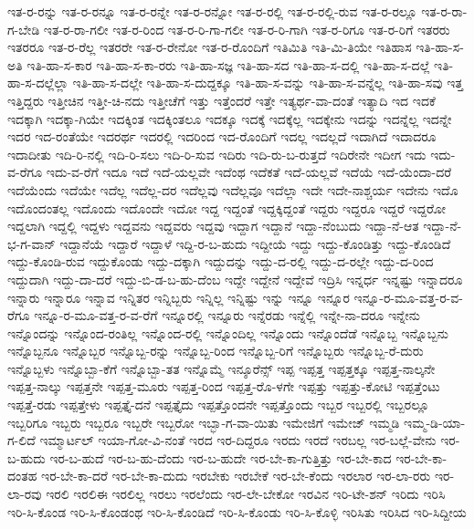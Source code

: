 {ಇತ-ರ-ರನ್ನು
ಇತ-ರ-ರನ್ನೂ
ಇತ-ರ-ರನ್ನೇ
ಇತ-ರ-ರನ್ನೋ
ಇತ-ರ-ರಲ್ಲಿ
ಇತ-ರ-ರಲ್ಲಿ-ರುವ
ಇತ-ರ-ರಲ್ಲೂ
ಇತ-ರ-ರಾ-ಗ-ಬೇಡಿ
ಇತ-ರ-ರಾ-ಗಲೀ
ಇತ-ರ-ರಿಂದ
ಇತ-ರ-ರಿ-ಗಾ-ಗಲೀ
ಇತ-ರ-ರಿ-ಗಾಗಿ
ಇತ-ರ-ರಿಗೂ
ಇತ-ರ-ರಿಗೆ
ಇತರರು
ಇತರರೂ
ಇತ-ರ-ರೆಲ್ಲ
ಇತರರೇ
ಇತ-ರ-ರೇನೋ
ಇತ-ರ-ರೊಂದಿಗೆ
ಇತಿಮಿತಿ
ಇತಿ-ಮಿ-ತಿಯೇ
ಇತಿಹಾಸ
ಇತಿ-ಹಾ-ಸ-ಅತಿ
ಇತಿ-ಹಾ-ಸ-ಕಾರ
ಇತಿ-ಹಾ-ಸ-ಕಾ-ರರು
ಇತಿ-ಹಾ-ಸಜ್ಞ
ಇತಿ-ಹಾ-ಸದ
ಇತಿ-ಹಾ-ಸ-ದಲ್ಲಿ
ಇತಿ-ಹಾ-ಸ-ದಲ್ಲೆ
ಇತಿ-ಹಾ-ಸ-ದಲ್ಲೆಲ್ಲಾ
ಇತಿ-ಹಾ-ಸ-ದಲ್ಲೇ
ಇತಿ-ಹಾ-ಸ-ದುದ್ದಕ್ಕೂ
ಇತಿ-ಹಾ-ಸ-ವನ್ನು
ಇತಿ-ಹಾ-ಸ-ವನ್ನೆಲ್ಲ
ಇತಿ-ಹಾ-ಸವು
ಇತ್ತ
ಇತ್ತಿದ್ದರು
ಇತ್ತೀಚಿನ
ಇತ್ತೀ-ಚಿ-ನದು
ಇತ್ತೀಚೆಗೆ
ಇತ್ತು
ಇತ್ತೆಂದರೆ
ಇತ್ತೇ
ಇತ್ಯರ್ಥ-ವಾ-ದಂತೆ
ಇತ್ಯಾದಿ
ಇದ
ಇದಕೆ
ಇದಕ್ಕಾಗಿ
ಇದಕ್ಕಾ-ಗಿಯೇ
ಇದಕ್ಕಿಂತ
ಇದಕ್ಕಿಂತಲೂ
ಇದಕ್ಕೂ
ಇದಕ್ಕೆ
ಇದಕ್ಕೆಲ್ಲ
ಇದಕ್ಕೇನು
ಇದನ್ನು
ಇದನ್ನೆಲ್ಲ
ಇದನ್ನೇ
ಇದರ
ಇದ-ರಂತೆಯೇ
ಇದರರ್ಥ
ಇದರಲ್ಲಿ
ಇದರಿಂದ
ಇದ-ರೊಂದಿಗೆ
ಇದಲ್ಲ
ಇದಲ್ಲದೆ
ಇದಾಗಿದೆ
ಇದಾದರೂ
ಇದಾದೀತು
ಇದಿ-ರಿ-ನಲ್ಲಿ
ಇದಿ-ರಿ-ಸಲು
ಇದಿ-ರಿ-ಸುವ
ಇದಿರು
ಇದಿ-ರು-ಬ-ರುತ್ತದೆ
ಇದಿರೇನೇ
ಇದೀಗ
ಇದು
ಇದು-ವ-ರೆಗೂ
ಇದು-ವ-ರೆಗೆ
ಇದೂ
ಇದೆ
ಇದೆ-ಯಲ್ಲವೇ
ಇದೆಂಥ
ಇದೆಕತೆ
ಇದೆ-ಯಲ್ಲವೆ
ಇದೆಯೆ
ಇದೆ-ಯೆಂದಾ-ದರೆ
ಇದೆಯೆಂದು
ಇದೆಯೇ
ಇದೆಲ್ಲ
ಇದೆಲ್ಲ-ದರ
ಇದೆಲ್ಲವು
ಇದೆಲ್ಲವೂ
ಇದೆಲ್ಲಾ
ಇದೇ
ಇದೇ-ನಾಶ್ಚರ್ಯ
ಇದೇನು
ಇದೊ
ಇದೊಂದಂತಲ್ಲ
ಇದೊಂದು
ಇದೊಂದೇ
ಇದೋ
ಇದ್ದ
ಇದ್ದಂತೆ
ಇದ್ದಕ್ಕಿದ್ದಂತೆ
ಇದ್ದರು
ಇದ್ದರೂ
ಇದ್ದರೆ
ಇದ್ದರೋ
ಇದ್ದಲಾಗಿ
ಇದ್ದಲ್ಲಿ
ಇದ್ದಳು
ಇದ್ದವನು
ಇದ್ದವರು
ಇದ್ದವು
ಇದ್ದಾಗ
ಇದ್ದಾನೆ
ಇದ್ದಾ-ನೆಂಬುದು
ಇದ್ದಾ-ನೆ-ಆತ
ಇದ್ದಾ-ನೆ-ಭ-ಗ-ವಾನ್
ಇದ್ದಾನೆಯೆ
ಇದ್ದಾರೆ
ಇದ್ದಾಳೆ
ಇದ್ದಿ-ರ-ಬ-ಹುದು
ಇದ್ದೀಯೆ
ಇದ್ದು
ಇದ್ದು-ಕೊಂಡಿತ್ತು
ಇದ್ದು-ಕೊಂಡಿದೆ
ಇದ್ದು-ಕೊಂಡಿ-ರುವ
ಇದ್ದುಕೊಂಡು
ಇದ್ದು-ದಕ್ಕಾಗಿ
ಇದ್ದುದನ್ನು
ಇದ್ದು-ದ-ರಲ್ಲಿ
ಇದ್ದು-ದ-ರಲ್ಲೇ
ಇದ್ದು-ದ-ರಿಂದ
ಇದ್ದುದಾಗಿ
ಇದ್ದು-ದಾ-ದರೆ
ಇದ್ದು-ಬಿ-ಡ-ಬ-ಹು-ದೆಂಬ
ಇದ್ದೇ
ಇದ್ದೇನೆ
ಇದ್ದೇವೆ
ಇದ್ರಿಸಿ
ಇನ್ನರ್ಧ
ಇನ್ನಷ್ಟು
ಇನ್ನಾದರೂ
ಇನ್ನಾರು
ಇನ್ನಾರೂ
ಇನ್ನಾವ
ಇನ್ನಿತರ
ಇನ್ನಿಬ್ಬರು
ಇನ್ನಿಲ್ಲ
ಇನ್ನಿಷ್ಟು
ಇನ್ನು
ಇನ್ನೂ
ಇನ್ನೂರ
ಇನ್ನೂ-ರ-ಮೂ-ವತ್ತ-ರ-ವ-ರೆಗೂ
ಇನ್ನೂ-ರ-ಮೂ-ವತ್ತ-ರ-ವ-ರೆಗೆ
ಇನ್ನೂರಲ್ಲಿ
ಇನ್ನೂರು
ಇನ್ನೆರಡು
ಇನ್ನೆಲ್ಲಿ
ಇನ್ನೇ-ನಾ-ದರೂ
ಇನ್ನೇನು
ಇನ್ನೊಂದನ್ನು
ಇನ್ನೊಂದ-ರಂತಿಲ್ಲ
ಇನ್ನೊಂದ-ರಲ್ಲಿ
ಇನ್ನೊಂದಿಲ್ಲ
ಇನ್ನೊಂದು
ಇನ್ನೊಂದೆಡೆ
ಇನ್ನೊಬ್ಬ
ಇನ್ನೊಬ್ಬನು
ಇನ್ನೊಬ್ಬನೂ
ಇನ್ನೊಬ್ಬರ
ಇನ್ನೊಬ್ಬ-ರನ್ನು
ಇನ್ನೊಬ್ಬ-ರಿಂದ
ಇನ್ನೊಬ್ಬ-ರಿಗೆ
ಇನ್ನೊಬ್ಬರು
ಇನ್ನೊಬ್ಬ-ರೆ-ದುರು
ಇನ್ನೊಬ್ಬಳು
ಇನ್ನೊಬ್ಬಾ-ಕೆಗೆ
ಇನ್ನೊಬ್ಬಾ-ತತ
ಇನ್ನೊಮ್ಮೆ
ಇನ್ಶೂರೆನ್ಸ್
ಇಪ್ಪ
ಇಪ್ಪತ್ತ
ಇಪ್ಪತ್ತಕ್ಕೂ
ಇಪ್ಪತ್ತ-ನಾಲ್ಕನೇ
ಇಪ್ಪತ್ತ-ನಾಲ್ಕು
ಇಪ್ಪತ್ತನೇ
ಇಪ್ಪತ್ತ-ಮೂರು
ಇಪ್ಪತ್ತ-ರಿಂದ
ಇಪ್ಪತ್ತ-ರೊ-ಳಗೇ
ಇಪ್ಪತ್ತು
ಇಪ್ಪತ್ತು-ಕೋಟಿ
ಇಪ್ಪತ್ತೆಂಟು
ಇಪ್ಪತ್ತೆ-ರಡು
ಇಪ್ಪತ್ತೇಳು
ಇಪ್ಪತ್ತೈ-ದನೆ
ಇಪ್ಪತ್ತೈದು
ಇಪ್ಪತ್ತೊಂದನೇ
ಇಪ್ಪತ್ತೊಂದು
ಇಬ್ಬರ
ಇಬ್ಬರಲ್ಲಿ
ಇಬ್ಬರಲ್ಲೂ
ಇಬ್ಬರಿಗೂ
ಇಬ್ಬರು
ಇಬ್ಬರೂ
ಇಬ್ಬರೇ
ಇಬ್ಬರೋ
ಇಬ್ಭಾ-ಗ-ವಾ-ಯಿತು
ಇಮೇಜಿಗೆ
ಇಮೇಜ್
ಇಮ್ಮಡಿ
ಇಮ್ಮ-ಡಿ-ಯಾ-ಗ-ಲಿದೆ
ಇಮ್ಮಾರ್ಟಲ್
ಇಯಾ-ಗೋ-ವಿ-ನಂತೆ
ಇರದ
ಇರ-ದಿದ್ದರೂ
ಇರದು
ಇರದೆ
ಇರಬಲ್ಲ
ಇರ-ಬಲ್ಲೆ-ವೇನು
ಇರ-ಬ-ಹುದು
ಇರ-ಬ-ಹುದೆ
ಇರ-ಬ-ಹು-ದೆಂದು
ಇರ-ಬ-ಹುದೇ
ಇರ-ಬೇ-ಕಾ-ಗುತ್ತಿತ್ತು
ಇರ-ಬೇ-ಕಾದ
ಇರ-ಬೇ-ಕಾ-ದಂತಹ
ಇರ-ಬೇ-ಕಾ-ದರೆ
ಇರ-ಬೇ-ಕಾ-ದುದು
ಇರಬೇಕು
ಇರಬೇಕೆ
ಇರ-ಬೇ-ಕೆಂದು
ಇರಲಾರ
ಇರ-ಲಾ-ರರು
ಇರ-ಲಾ-ರವು
ಇರಲಿ
ಇರಲಿಈ
ಇರಲಿಲ್ಲ
ಇರಲು
ಇರಲೆಂದು
ಇರ-ಲೇ-ಬೇಕೋ
ಇರವಿನ
ಇರಿ-ಟೇ-ಶನ್
ಇರಿದು
ಇರಿಸಿ
ಇರಿ-ಸಿ-ಕೊಂಡ
ಇರಿ-ಸಿ-ಕೊಂಡಂಥ
ಇರಿ-ಸಿ-ಕೊಂಡಿದೆ
ಇರಿ-ಸಿ-ಕೊಂಡು
ಇರಿ-ಸಿ-ಕೊಳ್ಳಿ
ಇರಿಸಿತು
ಇರಿಸಿದ
ಇರಿ-ಸಿದ್ದೀಯ
}
